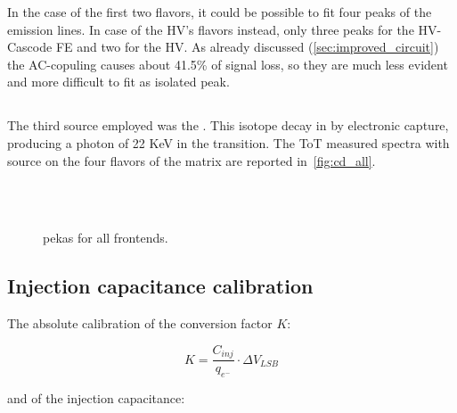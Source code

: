 In the case of the first two flavors, it could be possible to fit four peaks of the emission lines. In case of the HV's flavors instead, only three peaks for the HV-Cascode FE and two for the HV. As already discussed (\autoref{sec:improved_circuit}) the AC-copuling causes about 41.5\% of signal loss, so they are much less evident and more difficult to fit as isolated peak.


\subsection{}

The third source employed was the . This isotope decay in  by electronic capture, producing a photon of 22 KeV in the transition. The ToT measured spectra with  source on the four flavors of the matrix are reported in~\autoref{fig:cd_all}. 

\begin{figure}[h!]
\centering
{}\quad
{}\\
\quad
{}\\
\caption{ pekas for all frontends.}
\label{fig:cd_all}
\end{figure}



\subsection{Injection capacitance calibration}

The absolute calibration of the conversion factor $K$:

\begin{equation}
K = \frac{C_{inj}}{q_{e^{-}}} \cdot \Delta V_{LSB}
\end{equation}

and of the injection capacitance:

